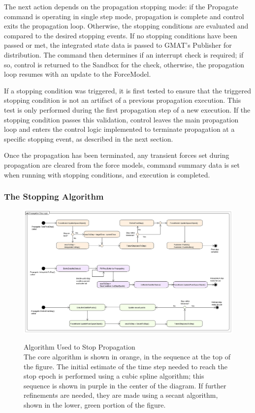 The next action depends on the propagation stopping mode: if the Propagate command is operating in
single step mode, propagation is complete and control exits the propagation loop.  Otherwise, the
stopping conditions are evaluated and compared to the desired stopping events.  If no stopping
conditions have been passed or met, the integrated state data is passed to GMAT's Publisher for
distribution.  The command then determines if an interrupt check is required; if so, control is
returned to the Sandbox for the check, otherwise, the propagation loop resumes with an update to the
ForceModel.

If a stopping condition was triggered, it is first tested to ensure that the triggered stopping
condition is not an artifact of a previous propagation execution.  This test is only performed
during the first propagation step of a new execution.  If the stopping condition passes this
validation, control leaves the main propagation loop and enters the control logic implemented to
terminate propagation at a specific stopping event, as described in the next section.

Once the propagation has been terminated, any transient forces set during propagation are cleared
from the force models, command summary data is set when running with stopping conditions, and
execution is completed.

\subsubsection{The Stopping Algorithm}

\begin{figure}[htb]
\begin{center}
\includegraphics[445,284]{Images/PropagationStopLogic.png}
\begin{quote}
\caption[Algorithm Used to Stop Propagation]{\label{figure:StopAlgorithm}Algorithm Used to Stop
Propagation\\The core algorithm is shown in orange, in the sequence at the top of the figure.  The
initial estimate of the time step needed to reach the stop epoch is performed using a cubic spline
algorithm; this sequence is shown in purple in the center of the diagram.  If further refinements
are needed, they are made using a secant algorithm, shown in the lower, green portion of the
figure.}
\end{quote}
\end{center}
\end{figure}

